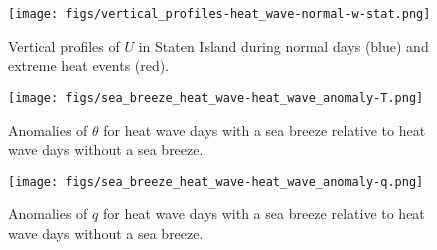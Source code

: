 \documentclass[11pt,a4paper]{article}
\begin{document}
\begin{figure}[ht]
	\centering
	\texttt{[image: figs/vertical\_profiles-heat\_wave-normal-w-stat.png]}
	\caption{Vertical profiles of $U$ in Staten Island during normal days (blue) and extreme heat events (red).}
	\label{fig:extreme-heat-normal-vertical_profiles-w-stat}
\end{figure}

\begin{figure}[ht]
	\centering
	\texttt{[image: figs/sea\_breeze\_heat\_wave-heat\_wave\_anomaly-T.png]}
	\caption{Anomalies of $\theta$ for heat wave days with a sea breeze relative to heat wave days without a sea breeze.}
	\label{fig:sea_breeze_heat_wave_anomaly-T}
\end{figure}
\begin{figure}[ht]
	\centering
	\texttt{[image: figs/sea\_breeze\_heat\_wave-heat\_wave\_anomaly-q.png]}
	\caption{Anomalies of $q$ for heat wave days with a sea breeze relative to heat wave days without a sea breeze.}
	\label{fig:sea_breeze_heat_wave_anomaly-q}
\end{figure}
\end{document}
